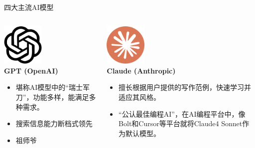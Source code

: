 \documentclass{beamer}
\begin{document}
\begin{frame}{四大主流AI模型}
    \begin{columns}[T]
        \begin{column}{0.5\textwidth}
            \begin{center}
                \includegraphics[height=2cm]{assets/openai.png} \\
                \large\textbf{GPT (OpenAI)}
            \end{center}
            \begin{itemize}
                \item 堪称AI模型中的“瑞士军刀”，功能多样，能满足多种需求。
                \item 搜索信息能力断档式领先
                \item 祖师爷
            \end{itemize}
        \end{column}

        \begin{column}{0.5\textwidth}
            \begin{center}
                \includegraphics[height=2cm]{assets/claude.png} \\
                \large\textbf{Claude (Anthropic)}
            \end{center}
            \begin{itemize}
                \item  擅长根据用户提供的写作范例，快速学习并适应其风格。
                \item  “公认最佳编程AI”，在AI编程平台中，像Bolt和Cursor等平台就将Claude4 Sonnet作为默认模型。
            \end{itemize}
        \end{column}
    \end{columns}
\end{frame}
\end{document}
